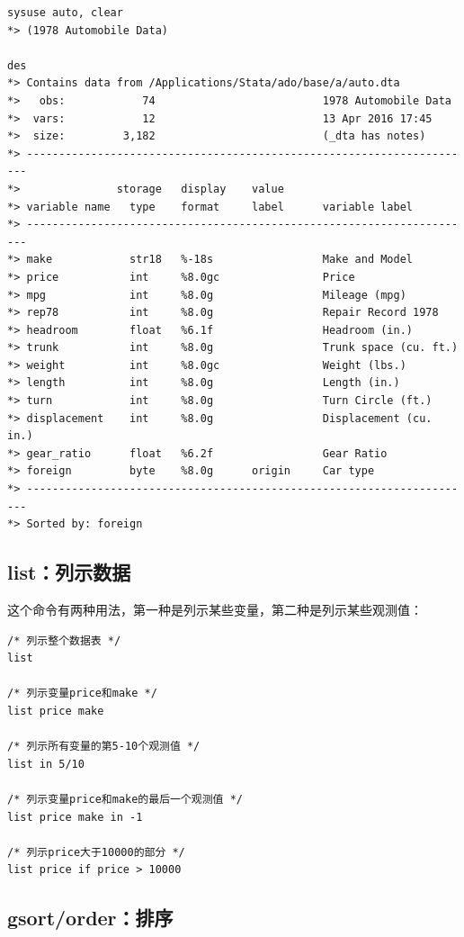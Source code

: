 \documentclass[]{ctexbook}
\begin{document}
\begin{lstlisting}
sysuse auto, clear
*> (1978 Automobile Data)

des
*> Contains data from /Applications/Stata/ado/base/a/auto.dta
*>   obs:            74                          1978 Automobile Data
*>  vars:            12                          13 Apr 2016 17:45
*>  size:         3,182                          (_dta has notes)
*> ----------------------------------------------------------------------
*>               storage   display    value
*> variable name   type    format     label      variable label
*> ----------------------------------------------------------------------
*> make            str18   %-18s                 Make and Model
*> price           int     %8.0gc                Price
*> mpg             int     %8.0g                 Mileage (mpg)
*> rep78           int     %8.0g                 Repair Record 1978
*> headroom        float   %6.1f                 Headroom (in.)
*> trunk           int     %8.0g                 Trunk space (cu. ft.)
*> weight          int     %8.0gc                Weight (lbs.)
*> length          int     %8.0g                 Length (in.)
*> turn            int     %8.0g                 Turn Circle (ft.)
*> displacement    int     %8.0g                 Displacement (cu. in.)
*> gear_ratio      float   %6.2f                 Gear Ratio
*> foreign         byte    %8.0g      origin     Car type
*> ----------------------------------------------------------------------
*> Sorted by: foreign
\end{lstlisting}

\hypertarget{list}{%
\subsection{list：列示数据}\label{list}}

这个命令有两种用法，第一种是列示某些变量，第二种是列示某些观测值：

\begin{lstlisting}
/* 列示整个数据表 */
list

/* 列示变量price和make */
list price make

/* 列示所有变量的第5-10个观测值 */
list in 5/10

/* 列示变量price和make的最后一个观测值 */
list price make in -1

/* 列示price大于10000的部分 */
list price if price > 10000
\end{lstlisting}

\hypertarget{gsortorder}{%
\subsection{gsort/order：排序}\label{gsortorder}}
\end{document}
